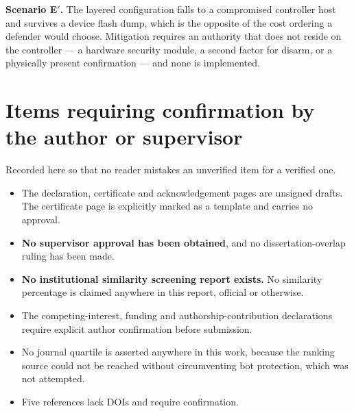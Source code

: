 \textbf{Scenario E$'$.} The layered configuration falls to a compromised controller host and
survives a device flash dump, which is the opposite of the cost ordering a defender would choose.
Mitigation requires an authority that does not reside on the controller --- a hardware security
module, a second factor for disarm, or a physically present confirmation --- and none is
implemented.

\section{Items requiring confirmation by the author or supervisor}

Recorded here so that no reader mistakes an unverified item for a verified one.

\begin{itemize}[leftmargin=1.6em,itemsep=4pt]
  \item The declaration, certificate and acknowledgement pages are unsigned drafts. The
        certificate page is explicitly marked as a template and carries no approval.
  \item \textbf{No supervisor approval has been obtained}, and no dissertation-overlap ruling has
        been made.
  \item \textbf{No institutional similarity screening report exists.} No similarity percentage is
        claimed anywhere in this report, official or otherwise.
  \item The competing-interest, funding and authorship-contribution declarations require explicit
        author confirmation before submission.
  \item No journal quartile is asserted anywhere in this work, because the ranking source could
        not be reached without circumventing bot protection, which was not attempted.
  \item Five references lack DOIs and require confirmation.
\end{itemize}
